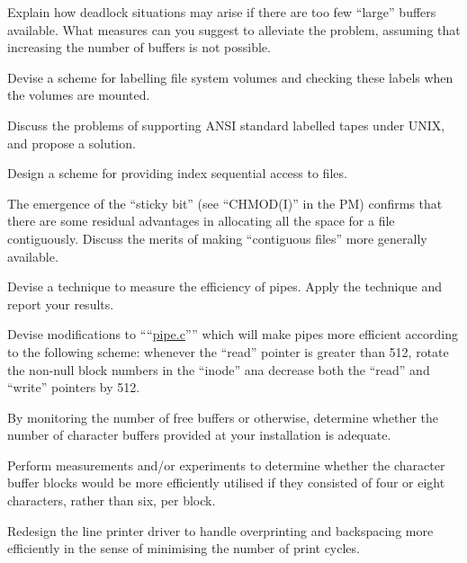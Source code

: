 \item[3.5] Explain how deadlock situations may
arise if there are too few ``large''
buffers available. What measures can
you suggest to alleviate the problem,
assuming that increasing the number of
buffers is not possible.
\ed


\bd
\item[4.1] Devise a scheme for labelling file
system volumes and checking these
labels when the volumes are mounted.

\item[4.2] Discuss the problems of supporting
ANSI standard labelled tapes under
UNIX, and propose a solution.

\item[4.3] Design a scheme for providing index
sequential access to files.

\item[4.4] The emergence of the ``sticky bit''
(see ``CHMOD(I)'' in the PM) confirms
that there are some residual advantages
in allocating all the space for a file
contiguously. Discuss the merits of
making ``contiguous files'' more generally available.

\item[4.5] Devise a technique to measure the
efficiency of pipes. Apply the technique and report your results.

\item[4.6] Devise modifications to ````\href{./v6/ken/pipe.c}{pipe.c}''''
which will make pipes more efficient
according to the following scheme:
whenever the ``read'' pointer is greater
than 512, rotate the non-null block
numbers in the ``inode'' ana decrease
both the ``read'' and ``write'' pointers by
512.

\item[5.1] By monitoring the number of free
buffers or otherwise, determine whether
the number of character buffers provided at your installation is adequate.

\item[5.2] Perform measurements and/or experiments
to determine whether the character buffer
blocks would be more efficiently utilised if they consisted of
four or eight characters, rather than
six, per block.

\item[5.3] Redesign the line printer driver to
handle overprinting and backspacing
more efficiently in the sense of
minimising the number of print cycles.


